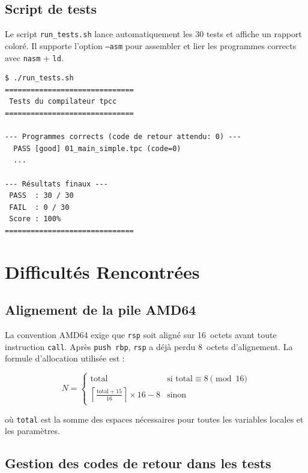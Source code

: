 \documentclass[12pt,a4paper]{article}
\begin{document}
\subsection{Script de tests}

Le script \texttt{run\_tests.sh} lance automatiquement les 30 tests et
affiche un rapport coloré. Il supporte l'option \texttt{--asm} pour
assembler et lier les programmes corrects avec \texttt{nasm} + \texttt{ld}.

\begin{verbatim}
$ ./run_tests.sh
==============================
 Tests du compilateur tpcc
==============================

--- Programmes corrects (code de retour attendu: 0) ---
  PASS [good] 01_main_simple.tpc (code=0)
  ...

--- Résultats finaux ---
 PASS  : 30 / 30
 FAIL  : 0 / 30
 Score : 100%
==============================
\end{verbatim}

\section{Difficultés Rencontrées}

\subsection{Alignement de la pile AMD64}

La convention AMD64 exige que \texttt{rsp} soit aligné sur 16~octets avant
toute instruction \texttt{call}. Après \texttt{push rbp}, \texttt{rsp} a déjà
perdu 8~octets d'alignement. La formule d'allocation utilisée est :

\[
N = \begin{cases}
  \text{total} & \text{si } \text{total} \equiv 8 \pmod{16} \\
  \left\lceil \frac{\text{total}+15}{16} \right\rceil \times 16 - 8 & \text{sinon}
\end{cases}
\]

où \texttt{total} est la somme des espaces nécessaires pour toutes les
variables locales et les paramètres.

\subsection{Gestion des codes de retour dans les tests}
\end{document}
